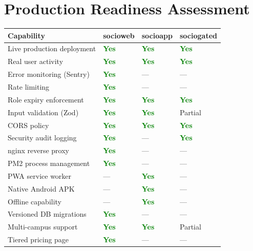 \documentclass[12pt,a4paper]{article}
\begin{document}
\newpage
\section{Production Readiness Assessment}

\begin{tabularx}{\textwidth}{L{5cm} C{2cm} C{2cm} C{2cm}}
\toprule
{}
\textbf{Capability} & \textbf{socioweb} & \textbf{socioapp} & \textbf{sociogated} \\
\midrule
Live production deployment & \textcolor{green}{\textbf{Yes}} & \textcolor{green}{\textbf{Yes}} & \textcolor{green}{\textbf{Yes}} \\
Real user activity & \textcolor{green}{\textbf{Yes}} & \textcolor{green}{\textbf{Yes}} & \textcolor{green}{\textbf{Yes}} \\
Error monitoring (Sentry) & \textcolor{green}{\textbf{Yes}} & --- & --- \\
Rate limiting & \textcolor{green}{\textbf{Yes}} & --- & --- \\
Role expiry enforcement & \textcolor{green}{\textbf{Yes}} & \textcolor{green}{\textbf{Yes}} & \textcolor{green}{\textbf{Yes}} \\
Input validation (Zod) & \textcolor{green}{\textbf{Yes}} & \textcolor{green}{\textbf{Yes}} & Partial \\
CORS policy & \textcolor{green}{\textbf{Yes}} & \textcolor{green}{\textbf{Yes}} & \textcolor{green}{\textbf{Yes}} \\
Security audit logging & \textcolor{green}{\textbf{Yes}} & --- & \textcolor{green}{\textbf{Yes}} \\
nginx reverse proxy & \textcolor{green}{\textbf{Yes}} & --- & --- \\
PM2 process management & \textcolor{green}{\textbf{Yes}} & --- & --- \\
PWA service worker & --- & \textcolor{green}{\textbf{Yes}} & --- \\
Native Android APK & --- & \textcolor{green}{\textbf{Yes}} & --- \\
Offline capability & --- & \textcolor{green}{\textbf{Yes}} & --- \\
Versioned DB migrations & \textcolor{green}{\textbf{Yes}} & --- & --- \\
Multi-campus support & \textcolor{green}{\textbf{Yes}} & \textcolor{green}{\textbf{Yes}} & Partial \\
Tiered pricing page & \textcolor{green}{\textbf{Yes}} & --- & --- \\
\bottomrule
\end{tabularx}
\end{document}
